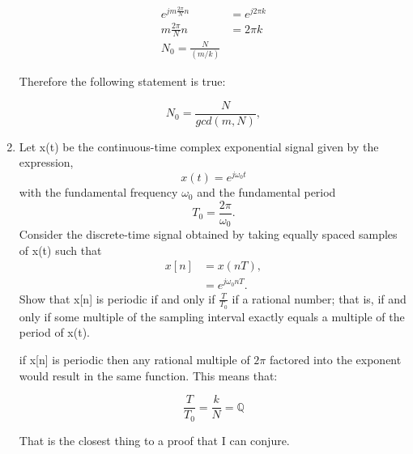 \documentclass{article}
\begin{document}
\begin{enumerate}
\begin{align}
    e^{jm\frac{2\pi}{N}n} &= e^{j2\pi k}\\
    m\frac{2\pi}{N}n &= 2\pi k\\
    N_0 = \frac{N}{(m/k)}
\end{align}
\begin{center}
    Therefore the following statement is true:
\end{center}
\begin{equation}
    N_0 = \frac{N}{gcd(m,N)},
\end{equation}
\newpage
\item Let x(t) be the continuous-time complex exponential signal given by the expression,
\begin{equation}
    x(t) = e^{j\omega_0t}
\end{equation}
with the fundamental frequency $\omega_0$ and the fundamental period
\begin{equation}
    T_0 = \frac{2\pi}{\omega_0}.
\end{equation}
Consider the discrete-time signal obtained by taking equally spaced samples of x(t) such that 
\begin{align}
    x[n] &= x(nT),\\
    &= e^{j\omega_0nT}.
\end{align}
Show that x[n] is periodic if and only if $\frac{T}{T_0}$ if a rational number; that is, if and only if some multiple of the sampling interval exactly equals a multiple of the period of x(t).
\begin{center}
    if x[n] is periodic then any rational multiple of $2\pi$ factored into the exponent would result in the same function. This means that:
\end{center}
\begin{equation}
    \frac{T}{T_0} = \frac{k}{N} = \mathbb{Q}
\end{equation}
\begin{center}
    That is the closest thing to a proof that I can conjure.
\end{center}
\newpage
\end{enumerate}
\end{document}
